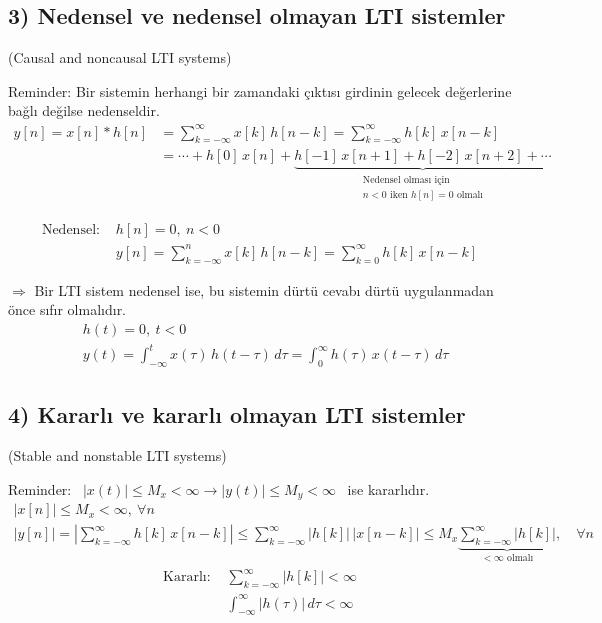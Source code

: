 \documentclass[11pt,a4paper]{article}
\begin{document}
\renewcommand{\thempfootnote}{\alph{mpfootnote}} %

\subsection{3) Nedensel ve nedensel olmayan LTI sistemler}
(Causal and noncausal LTI systems)

Reminder: Bir sistemin herhangi bir zamandaki çıktısı girdinin gelecek değerlerine bağlı değilse nedenseldir.
\begin{align*}
  y[n] = x[n] \ast h[n] &= \sum_{k=-\infty}^{\infty} x[k]\,h[n-k] = \sum_{k=-\infty}^{\infty} h[k]\,x[n-k] \\
  &= \cdots + h[0]\,x[n] + \underbrace{h[-1]\,x[n+1] + h[-2]\,x[n+2] + \cdots}_{\substack{\text{Nedensel olması için}\\ n<0 \text{ iken } h[n]=0 \text{ olmalı}}}
\end{align*}

\begin{align*}
  \text{Nedensel: } & h[n] = 0, \ n < 0 \\
  & y[n] = \sum_{k=-\infty}^{n} x[k]\,h[n-k] = \sum_{k=0}^{\infty} h[k]\,x[n-k]
\end{align*}

$\Rightarrow$ Bir LTI sistem nedensel ise, bu sistemin dürtü cevabı dürtü uygulanmadan önce sıfır olmalıdır.
\begin{align*}
  & h(t) = 0, \ t < 0 \\
  & y(t) = \int_{-\infty}^{t} x(\tau)\,h(t-\tau)\,d\tau = \int_{0}^{\infty} h(\tau)\,x(t-\tau)\,d\tau
\end{align*}

\subsection{4) Kararlı ve kararlı olmayan LTI sistemler}
(Stable and nonstable LTI systems)

Reminder: \ $|x(t)| \leq M_x < \infty \longrightarrow |y(t)| \leq M_y < \infty$ \ ise kararlıdır.
\begin{gather*}
  |x[n]| \leq M_x < \infty, \ \forall n \\
  |y[n]| = \left|\sum_{k=-\infty}^{\infty} h[k]\,x[n-k]\right| \leq \sum_{k=-\infty}^{\infty} |h[k]|\,|x[n-k]| \leq M_x \underbrace{\sum_{k=-\infty}^{\infty} |h[k]|}_{<\infty \text{ olmalı}}, \quad \forall n
\end{gather*}
\begin{align*}
  \text{Kararlı: } & \sum_{k=-\infty}^{\infty} |h[k]| < \infty \\
  & \int_{-\infty}^{\infty} |h(\tau)|\,d\tau < \infty
\end{align*}
\end{document}

